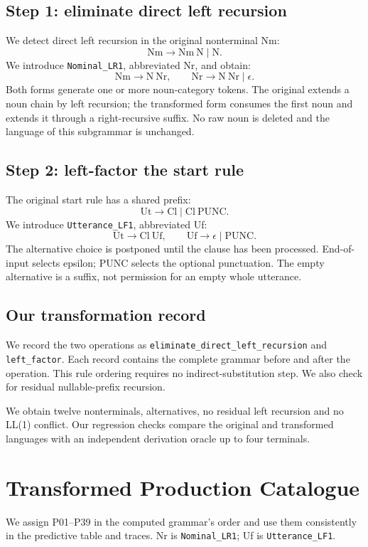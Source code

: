 \documentclass[11pt]{article}
\newcommand{\code}[1]{\texttt{#1}}
\begin{document}
\subsection*{Step 1: eliminate direct left recursion}
We detect direct left recursion in the original nonterminal Nm:
\[
  \mathrm{Nm}\rightarrow\mathrm{Nm}\ \mathrm{N}\mid\mathrm{N}.
\]
We introduce \code{Nominal\_LR1}, abbreviated Nr, and obtain:
\[
  \mathrm{Nm}\rightarrow\mathrm{N}\ \mathrm{Nr},
  \qquad
  \mathrm{Nr}\rightarrow\mathrm{N}\ \mathrm{Nr}\mid\epsilon .
\]
Both forms generate one or more noun-category tokens. The original extends
a noun chain by left recursion; the transformed form consumes the first noun
and extends it through a right-recursive suffix. No raw noun is deleted and
the language of this subgrammar is unchanged.

\subsection*{Step 2: left-factor the start rule}
The original start rule has a shared prefix:
\[
  \mathrm{Ut}\rightarrow\mathrm{Cl}\mid\mathrm{Cl}\ \mathrm{PUNC}.
\]
We introduce \code{Utterance\_LF1}, abbreviated Uf:
\[
  \mathrm{Ut}\rightarrow\mathrm{Cl}\ \mathrm{Uf},
  \qquad
  \mathrm{Uf}\rightarrow\epsilon\mid\mathrm{PUNC}.
\]
The alternative choice is postponed until the clause has been processed.
End-of-input selects epsilon; PUNC selects the optional punctuation. The
empty alternative is a suffix, not permission for an empty whole utterance.

\subsection*{Our transformation record}
We record the two operations as
\nolinkurl{eliminate_direct_left_recursion} and \nolinkurl{left_factor}.
Each record contains the complete grammar before and after the operation.
This rule ordering requires no indirect-substitution step. We also check
for residual nullable-prefix recursion.

We obtain twelve nonterminals, \GrammarProductions{} alternatives, no residual
left recursion and no LL(1) conflict. Our regression checks compare the
original and transformed languages with an independent derivation oracle
up to four terminals.

\clearpage
\section{Transformed Production Catalogue}
We assign P01--P39 in the computed grammar's order and use them consistently
in the predictive table and traces. Nr is \code{Nominal\_LR1};
Uf is \code{Utterance\_LF1}.
\end{document}
